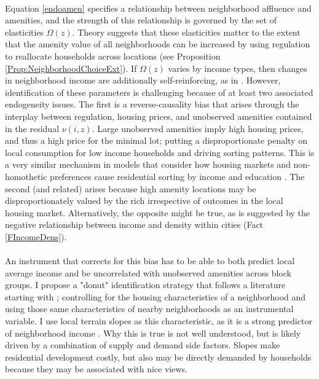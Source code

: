 \documentclass[11pt]{article}
\begin{document}
\paragraph*{}
Equation \eqref{endoamen} specifies a relationship between neighborhood affluence and amenities, and the strength of this relationship is governed by the set of elasticities $\Omega(z)$. Theory suggests that these elasticities matter to the extent that the amenity value of all neighborhoods can be increased by using regulation to reallocate households across locations (see Proposition \ref{Prop:NeighborhoodChoiceExt}). If $\Omega(z)$ varies by income types, then changes in neighborhood income are additionally self-reinforcing, as in \cite{diamond2016}.  However, identification of these parameters is challenging because of at least two associated endogeneity issues. The first is a reverse-causality bias that arises through the interplay between regulation, housing prices, and unobserved amenities contained in the residual $\nu(i,z)$. Large unobserved amenities imply high housing prices, and thus a high price for the minimal lot; putting a disproportionate penalty on local consumption for low income households and driving sorting patterns. This is a very similar mechanism in models that consider how housing markets and non-homothetic preferences cause residential sorting by income and education \citep{LeeandLin, Coutureetal}. The second (and related) arises because high amenity locations may be disproportionately valued by the rich irrespective of outcomes in the local housing market. Alternatively, the opposite might be true, as is suggested by the negative relationship between income and density within cities (Fact \ref{FIncomeDens}). 

\paragraph*{}
An instrument that corrects for this bias has to be able to both predict local average income and be uncorrelated with unobserved amenities across block groups. I propose a "donut" identification strategy that follows a literature starting with \cite*{BFMJPE}; controlling for the housing characteristics of a neighborhood and using those same characteristics of nearby neighborhoods as an instrumental variable. I use local terrain slopes as this characteristic, as it is a strong predictor of neighborhood income \citep{LeeandLin, saiz2010}. Why this is true is not well understood, but is likely driven by a combination of supply and demand side factors. Slopes make residential development costly, but also may be directly demanded by households because they may be associated with nice views.  
\end{document}
